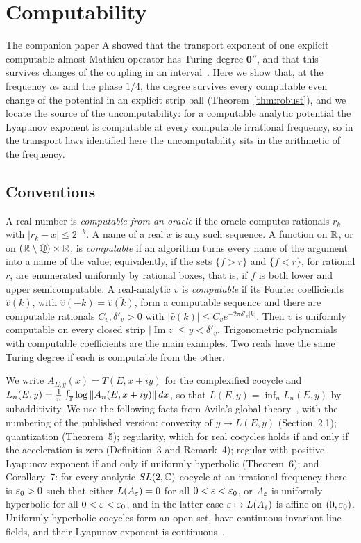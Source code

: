 \section{Computability}\label{sec:computability}

The companion paper A showed that the transport exponent of one explicit computable almost Mathieu operator has Turing degree $\mathbf 0''$, and that this survives changes of the coupling in an interval~\cite[Theorem~D]{DMamo}. Here we show that, at the frequency $\alpha_*$ and the phase $1/4$, the degree survives every computable even change of the potential in an explicit strip ball (Theorem~\ref{thm:robust}), and we locate the source of the uncomputability: for a computable analytic potential the Lyapunov exponent is computable at every computable irrational frequency, so in the transport laws identified here the uncomputability sits in the arithmetic of the frequency.

\subsection{Conventions}

A real number is \emph{computable from an oracle} if the oracle computes rationals $r_k$ with $|r_k-x|\le2^{-k}$. A name of a real $x$ is any such sequence. A function on $\mathbb R$, or on $(\mathbb R\setminus\mathbb Q)\times\mathbb R$, is \emph{computable} if an algorithm turns every name of the argument into a name of the value; equivalently, if the sets $\{f>r\}$ and $\{f<r\}$, for rational $r$, are enumerated uniformly by rational boxes, that is, if $f$ is both lower and upper semicomputable. A real-analytic $v$ is \emph{computable} if its Fourier coefficients $\hat v(k)$, with $\hat v(-k)=\overline{\hat v(k)}$, form a computable sequence and there are computable rationals $C_v,\delta'_v>0$ with $|\hat v(k)|\le C_ve^{-2\pi\delta'_v|k|}$. Then $v$ is uniformly computable on every closed strip $|\operatorname{Im}z|\le y<\delta'_v$. Trigonometric polynomials with computable coefficients are the main examples. Two reals have the same Turing degree if each is computable from the other.

We write $A_{E,y}(x)=T(E,x+iy)$ for the complexified cocycle and $L_n(E,y)=\frac1n\int_\mathbb T\log\|A_n(E,x+iy)\|\,dx$, so that $L(E,y)=\inf_nL_n(E,y)$ by subadditivity. We use the following facts from Avila's global theory~\cite{Avila2015}, with the numbering of the published version: convexity of $y\mapsto L(E,y)$ (Section~2.1); quantization (Theorem~5); regularity, which for real cocycles holds if and only if the acceleration is zero (Definition~3 and Remark~4); regular with positive Lyapunov exponent if and only if uniformly hyperbolic (Theorem~6); and Corollary~7: for every analytic $SL(2,\mathbb C)$ cocycle at an irrational frequency there is $\varepsilon_0>0$ such that either $L(A_\varepsilon)=0$ for all $0<\varepsilon<\varepsilon_0$, or $A_\varepsilon$ is uniformly hyperbolic for all $0<\varepsilon<\varepsilon_0$, and in the latter case $\varepsilon\mapsto L(A_\varepsilon)$ is affine on $(0,\varepsilon_0)$. Uniformly hyperbolic cocycles form an open set, have continuous invariant line fields, and their Lyapunov exponent is continuous~\cite[Section~2.1]{Avila2015}.

